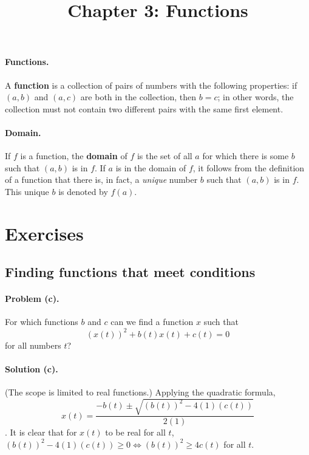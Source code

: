 \documentclass{article}
\begin{document}
\title{Chapter 3: Functions}
\maketitle

\paragraph{Functions.} A \textbf{function} is a collection of pairs of numbers
with the following properties: if $(a, b)$ and $(a, c)$ are both in the
collection, then $b = c$; in other words, the collection must not contain two
different pairs with the same first element.

\paragraph{Domain.} If $f$ is a function, the \textbf{domain} of $f$ is the set
of all $a$ for which there is some $b$ such that $(a, b)$ is in $f$. If $a$ is
in the domain of $f$, it follows from the definition of a function that there
is, in fact, a \emph{unique} number $b$ such that $(a, b)$ is in $f$. This
unique $b$ is denoted by $f(a)$.

\section{Exercises}

\setcounter{subsection}{9}
\subsection{Finding functions that meet conditions}

\paragraph{Problem (c).} For which functions $b$ and $c$ can we find a function
$x$ such that \begin{equation*}
  (x(t))^2 + b(t)x(t) + c(t) = 0
\end{equation*} for all numbers $t$?

\paragraph{Solution (c).} (The scope is limited to real functions.) Applying
the quadratic formula, \begin{equation*}
  x(t) = \frac{-b(t) \pm \sqrt{(b(t))^2 - 4(1)(c(t))}}{2(1)}
\end{equation*}. It is clear that for $x(t)$ to be real for all $t$, $(b(t))^2
- 4(1)(c(t)) \geq 0 \iff (b(t))^2 \geq 4c(t)$ for all $t$.
\end{document}
